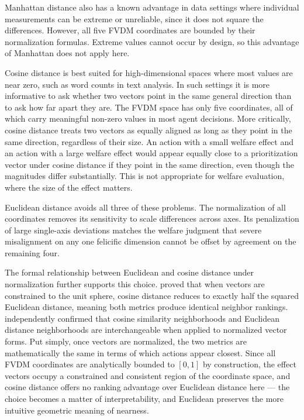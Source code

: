 \documentclass{icsthesis}
\begin{document}
\begin{mainmatter}
Manhattan distance also has a known advantage in data settings where individual measurements can be extreme or unreliable, since it does not square the differences. However, all five FVDM coordinates are bounded by their normalization formulas. Extreme values cannot occur by design, so this advantage of Manhattan does not apply here.

Cosine distance is best suited for high-dimensional spaces where most values are near zero, such as word counts in text analysis. In such settings it is more informative to ask whether two vectors point in the same general direction than to ask how far apart they are. The FVDM space has only five coordinates, all of which carry meaningful non-zero values in most agent decisions. More critically, cosine distance treats two vectors as equally aligned as long as they point in the same direction, regardless of their size. An action with a small welfare effect and an action with a large welfare effect would appear equally close to a prioritization vector under cosine distance if they point in the same direction, even though the magnitudes differ substantially. This is not appropriate for welfare evaluation, where the size of the effect matters.

Euclidean distance avoids all three of these problems. The normalization of all coordinates removes its sensitivity to scale differences across axes. Its penalization of large single-axis deviations matches the welfare judgment that severe misalignment on any one felicific dimension cannot be offset by agreement on the remaining four.

The formal relationship between Euclidean and cosine distance under normalization further supports this choice. \citet{Bouhsine2026} proved that when vectors are constrained to the unit sphere, cosine distance reduces to exactly half the squared Euclidean distance, meaning both metrics produce identical neighbor rankings. \citet{Kryszkiewicz2013} independently confirmed that cosine similarity neighborhoods and Euclidean distance neighborhoods are interchangeable when applied to normalized vector forms. Put simply, once vectors are normalized, the two metrics are mathematically the same in terms of which actions appear closest. Since all FVDM coordinates are analytically bounded to $[0,1]$ by construction, the effect vectors occupy a constrained and consistent region of the coordinate space, and cosine distance offers no ranking advantage over Euclidean distance here --- the choice becomes a matter of interpretability, and Euclidean preserves the more intuitive geometric meaning of nearness.


\end{mainmatter}
\end{document}

